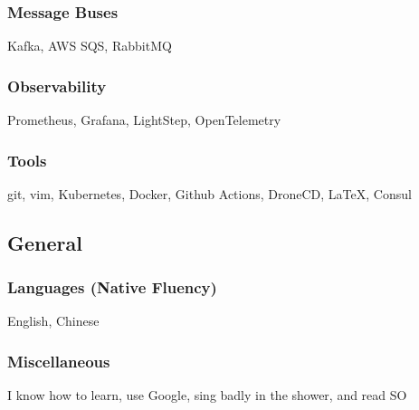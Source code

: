 \documentclass[]{two-column-resume}
\begin{document}
\begin{minipage}[t]{0.34\textwidth}
    \subsubsection{Message Buses}
            Kafka, 
            AWS SQS, 
            RabbitMQ
        \newline
    \subsubsection{Observability}
            Prometheus, 
            Grafana, 
            LightStep, 
            OpenTelemetry
        \newline
    \subsubsection{Tools}
            git, 
            vim, 
            Kubernetes, 
            Docker, 
            Github Actions, 
            DroneCD, 
            \LaTeX, 
            Consul
        \newline

\sectionsep

\subsection{General}

\subsubsection{Languages (Native Fluency)}
English, 
Chinese
\newline

\subsubsection{Miscellaneous}
I know how to learn, use Google, sing badly in the shower, and read SO

\setlength{\parindent}{0ex}
    \sectionsep

%
%

%
%


\end{minipage}
\end{document}
